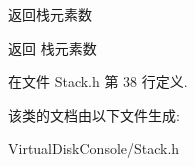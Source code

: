 返回栈元素数 

\begin{DoxyReturn}{返回}
栈元素数 
\end{DoxyReturn}


在文件 Stack.\-h 第 38 行定义.



该类的文档由以下文件生成\-:\begin{DoxyCompactItemize}
\item 
Virtual\-Disk\-Console/Stack.\-h\end{DoxyCompactItemize}

